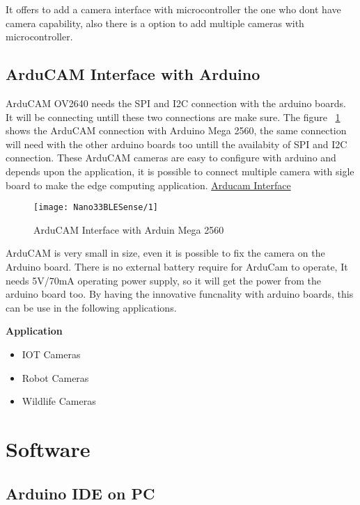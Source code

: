 It offers to add a camera interface with microcontroller the one who dont have camera capability, also there is a option to add multiple cameras with microcontroller.

\section{ArduCAM Interface with Arduino}

ArduCAM OV2640 needs the  SPI and I2C connection with the arduino boards. It will be connecting untill these two connections are make sure. The figure ~\ref{1} shows the ArduCAM connection with Arduino Mega 2560, the same connection will need with the other arduino boards too untill the availabity of  SPI and I2C connection. These ArduCAM cameras are easy to configure with arduino and depends upon the application, it is possible to connect multiple camera with sigle board to make the edge computing application. \href{https://www.arducam.com/product/arducam-2mp-spi-camera-b0067-arduino/}{Arducam Interface}

\begin{figure}[ht]
	\centering
	\texttt{[image: Nano33BLESense/1]}
	\caption{ArduCAM Interface with Arduin Mega 2560} 
	\label{1}
\end{figure}

ArduCAM is very small in size, even it is possible to fix the camera on the Arduino board. There is no external battery require for ArduCam to operate, It needs 5V/70mA operating power supply, so it will get the power from the arduino board too. By having the innovative funcnality with arduino boards, this can be use in the following applications.

\textbf{Application}

\begin{itemize}
  \item IOT Cameras
  \item Robot Cameras
  \item Wildlife Cameras
\end{itemize}  


\chapter{Software}

\section{Arduino IDE on PC}


